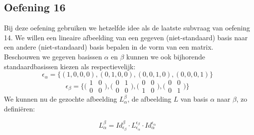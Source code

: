 \documentclass[lineaire_algebra_oplossingen.tex]{subfiles}
\begin{document}
\subsection{Oefening 16}
Bij deze oefening gebruiken we hetzelfde idee als de laatste subvraag van oefening 14. We willen een lineaire afbeelding van een gegeven (niet-standaard) basis naar een andere (niet-standaard) basis bepalen in de vorm van een matrix.\\
Beschouwen we gegeven basissen $\alpha$ en $\beta$ kunnen we ook bijhorende standaardbasissen kiezen als respectievelijk:
\[ \epsilon_\alpha = \{(1,0,0,0),(0,1,0,0),(0,0,1,0),(0,0,0,1)\}\]
\[ \epsilon_\beta = \{\bigl(\begin{smallmatrix} 1&0\\ 0&0 \end{smallmatrix} \bigr),\bigl(\begin{smallmatrix} 0&1\\ 0&0 \end{smallmatrix} \bigr),\bigl(\begin{smallmatrix} 0&0\\ 1&0 \end{smallmatrix} \bigr),\bigl(\begin{smallmatrix} 0&0\\ 0&1 \end{smallmatrix} \bigr)\}\]
We kunnen nu de gezochte afbeelding $L^\beta_\alpha$, de afbeelding $L$ van basis $\alpha$ naar $\beta$, zo defini\"eren:

\[
L^\beta_\alpha = Id^\beta_{\epsilon_\beta}\cdot L^{\epsilon_\beta}_{\epsilon_\alpha}\cdot Id^{\epsilon_\alpha}_{\alpha}
\]
\end{document}
